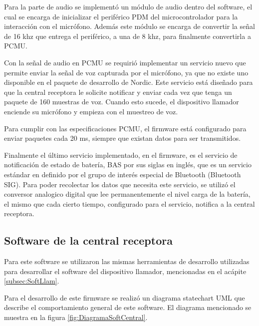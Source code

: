 Para la parte de audio se implementó un módulo de audio dentro del software, el cual se encarga de inicializar el periférico PDM del microcontrolador para la interacción con el micrófono. Además este módulo se encarga de convertir la señal de 16 khz que entrega el periférico, a una de 8 khz,  para finalmente convertirla a PCMU.

Con la señal de audio en PCMU se requirió implementar un servicio nuevo que permite enviar la señal de voz capturada por el micrófono, ya que no existe uno disponible en el paquete de desarrollo de Nordic. Este servicio está diseñado para que la central receptora le solicite notificar y enviar cada vez que tenga un paquete de 160 muestras de voz. Cuando esto sucede, el dispositivo llamador enciende su micrófono y empieza con el muestreo de voz.

Para cumplir con las especificaciones PCMU, el firmware está configurado para enviar paquetes cada 20 ms, siempre que existan datos para ser transmitidos.

Finalmente el último servicio implementado, en el firmware, es el servicio de notificación de estado de batería, BAS por sus siglas en inglés, que es un servicio estándar en definido por el grupo de interés especial de Bluetooth (Bluetooth SIG). Para poder recolectar los datos que necesita este servicio, se utilizó el conversor analogico digital que lee permanentemente el nivel carga de la batería, el mismo que cada cierto tiempo, configurado para el servicio, notifica a la central receptora.

\subsection{Software de la central receptora}
\label{subsec:SoftCentral}

Para este software se utilizaron las mismas herramientas de desarrollo utilizadas para desarrollar el software del dispositivo llamador, mencionadas en el acápite \ref{subsec:SoftLlam}.

Para el desarrollo de este firmware se realizó un diagrama statechart UML que describe el comportamiento general de este software. El diagrama mencionado se muestra en la figura \ref{fig:DiagramaSoftCentral}.


